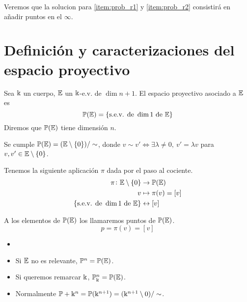 Veremos que la solucion para \ref{item:prob_r1} y \ref{item:prob_r2} consistirá
en añadir puntos en el $\infty$.

\section{Definición y caracterizaciones del espacio proyectivo}
\begin{defi}
    Sea $\Bbbk$ un cuerpo, $\mathbb{E}$ un $\Bbbk$-e.v. de $\dim n+1$. El espacio proyectivo asociado a $\mathbb{E}$ es
    \[\mathbb{P} (\mathbb{E}) = \left\{\text{s.e.v. de } \dim 1 \text{ de } \mathbb{E}\right\}\]
    Diremos que $\mathbb{P} (\mathbb{E})$ tiene dimensión $n$.
\end{defi}
\begin{obs}
    Se cumple $\mathbb{P} (\mathbb{E}) = (\mathbb{E} \setminus \left\{0\right\}) / \sim$, donde $v \sim v'  \iff \exists \lambda \neq 0, \ v' = \lambda v$ para
    $v, v' \in \mathbb{E} \setminus \left\{0\right\}$.
\end{obs}
\begin{defi*}
    Tenemos la siguiente aplicación $\pi$ dada por el paso al cociente.
    \[
    \begin{aligned}
    \pi \colon \mathbb{E} \setminus \left\{0\right\} &\to \mathbb{P} (\mathbb{E})\\
    v &\mapsto \pi(v) = [v]\\
    \left\{\text{s.e.v. de } \dim 1 \text{ de } \mathbb{E}\right\} &\leftrightarrow [v]
    \end{aligned}
    \]
\end{defi*}
\begin{defi}
    A los elementos de $\mathbb{P} (\mathbb{E})$ los llamaremos puntos de $\mathbb{P} (\mathbb{E})$.
    \[p = \pi(v) = [v]\]
\end{defi}
\begin{obs}
    \begin{itemize}
        \item[]
        \item Si $\mathbb{E}$ no es relevante, $\mathbb{P}^n = \mathbb{P} (\mathbb{E})$.
        \item Si queremos remarcar $\Bbbk$, $\mathbb{P}_\Bbbk^n = \mathbb{P} (\mathbb{E})$.
        \item Normalmente $\mathbb{P}+\Bbbk^n = \mathbb{P}(\Bbbk^{n+1}) = (\Bbbk^{n+1} \setminus {0})/\sim$.
    \end{itemize}
\end{obs}
